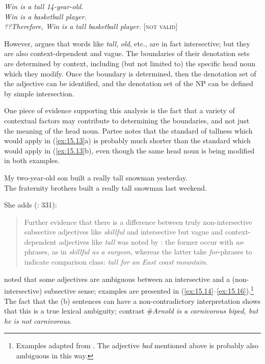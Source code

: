 \ea \label{ex:15.12}
\textit{Win is a tall 14-year-old.}\\
\textit{Win is a basketball player.\\
\FelixHRule
??Therefore, Win is a tall basketball player.} \hfill   [\textsc{not valid}]
\z


However, \citet{Siegel1976} argues that words like \textit{tall}, \textit{old}, etc., are in fact intersective; but they are also context-dependent and vague. The boundaries of their denotation sets are determined by context, including (but not limited to) the specific head noun which they modify. Once the boundary is determined, then the denotation set of the adjective can be identified, and the denotation set of the NP can be defined by simple intersection.



One piece of evidence supporting this analysis is the fact that a variety of contextual factors may contribute to determining the boundaries, and not just the meaning of the head noun. Partee notes that the standard of tallness which would apply in (\ref{ex:15.13}a) is probably much shorter than the standard which would apply in (\ref{ex:15.13}b), even though the same head noun is being modified in both examples.


\ea \label{ex:15.13}
\ea  My two-year-old son built a really tall snowman yesterday.\\
\ex The fraternity brothers built a really tall snowman last weekend.
                       \z
\z


She adds (\citeyear{Partee1995}: 331):
\begin{quote}
Further evidence that there is a difference between truly non-intersective subsective adjectives like \textit{skillful} and intersective but vague and context-dependent adjectives like \textit{tall} was noted by \citet{Siegel1976}: the former occur with \textit{as}-phrases, as in \textit{skillful as a surgeon}, whereas the latter take \textit{for}-phrases to indicate comparison class: \textit{tall for an East coast mountain}. 
\end{quote}


\citet{Bolinger1967} noted that some adjectives are ambiguous between an intersective and a (non-intersective) subsective sense; examples are presented in (\ref{ex:15.14}--\ref{ex:15.16}).\footnote{Examples adapted from \citet[ch. 2]{Morzycki2013}. The adjective \textit{bad} mentioned above is probably also ambiguous in this way.} The fact that the (b) sentences can have a non-contradictory interpretation shows that this is a true lexical ambiguity; contrast \#\textit{Arnold is a carnivorous biped, but he is not carnivorous}.


